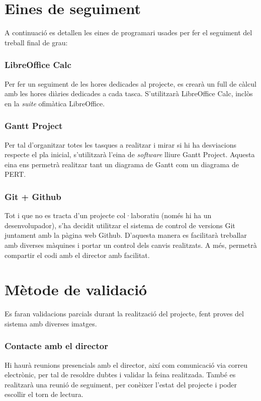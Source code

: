 \section{Eines de seguiment}
	A continuació es detallen les eines de programari usades per fer el seguiment del treball final de grau:
	\subsubsection{LibreOffice Calc}
		Per fer un seguiment de les hores dedicades al projecte, es crearà un full de càlcul amb les hores diàries dedicades a cada tasca. S'utilitzarà LibreOffice Calc, inclòs en
		la \textit{suite} ofimàtica LibreOffice.
	\subsubsection{Gantt Project}
		Per tal d'organitzar totes les tasques a realitzar i mirar si hi ha desviacions respecte el pla inicial, s'utilitzarà l'eina de \textit{software} lliure 
		Gantt Project\cite{GanttProject}. Aquesta eina ens permetrà realitzar tant un diagrama de Gantt com un diagrama de PERT.
	\subsubsection{Git + Github}
		Tot i que no es tracta d'un projecte col·laboratiu (només hi ha un desenvolupador), s'ha decidit utilitzar el sistema de control de versions Git juntament amb la pàgina web Github. 
		D'aquesta manera es facilitarà treballar amb diverses màquines i portar un control dels canvis realitzats. A més, permetrà compartir el codi amb el director amb facilitat.
	\section{Mètode de validació}
		Es faran validacions parcials durant la realització del projecte, fent proves del sistema amb diverses imatges.
	\subsubsection{Contacte amb el director}
		Hi haurà reunions presencials amb el director, així com comunicació via correu electrònic, per tal de resoldre dubtes i validar la feina realitzada. També es realitzarà una reunió de seguiment,
		per conèixer l'estat del projecte i poder escollir el torn de lectura.

